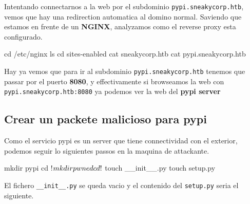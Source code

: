 \documentclass{assets/ipesethesis}
\newenvironment{Shaded}{\begin{snugshade}}{\end{snugshade}}
\newcommand{\BuiltInTok}[1]{#1}
\newcommand{\FunctionTok}[1]{\textcolor[rgb]{0.00,0.00,0.00}{#1}}
\newcommand{\NormalTok}[1]{#1}
\begin{document}
Intentando connectarnos a la web por el subdominio \texttt{pypi.sneakycorp.htb}, vemos que hay una redirection automatica al domino normal.
Saviendo que estamos en frente de un \textbf{NGINX}, analyzamos como el reverse proxy esta configurado.

\begin{Shaded}
\begin{Highlighting}[]
\BuiltInTok{cd}\NormalTok{ /etc/nginx}
\FunctionTok{ls}
\BuiltInTok{cd}\NormalTok{ sites-enabled}
\FunctionTok{cat}\NormalTok{ sneakycorp.htb}
\FunctionTok{cat}\NormalTok{ pypi.sneakycorp.htb}
\end{Highlighting}
\end{Shaded}

Hay ya vemos que para ir al subdominio \texttt{pypi.sneakycorp.htb} tenemos que passar por el puerto \textbf{8080}, y effectivamente si browseamos
la web con \texttt{pypi.sneakycorp.htb:8080} ya podemos ver la web del \textbf{pypi server}

\hypertarget{crear-un-packete-malicioso-para-pypi}{%
\subsection*{Crear un packete malicioso para pypi}\label{crear-un-packete-malicioso-para-pypi}}

Como el servicio pypi es un server que tiene connectividad con el exterior, podemos seguir lo siguientes passos en la maquina de attackante.

\begin{Shaded}
\begin{Highlighting}[]
\FunctionTok{mkdir}\NormalTok{ pypi}
\BuiltInTok{cd}\NormalTok{ !$}
\FunctionTok{mkdir}\NormalTok{ pwned}
\BuiltInTok{cd}\NormalTok{ !$}
\FunctionTok{touch}\NormalTok{ __init__.py}
\FunctionTok{touch}\NormalTok{ setup.py}
\end{Highlighting}
\end{Shaded}

El fichero \texttt{\_\_init\_\_.py} se queda vacio y el contenido del \texttt{setup.py} seria el siguiente.
\end{document}
